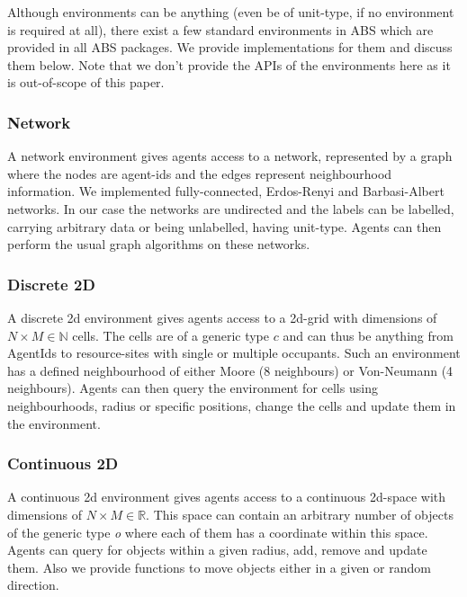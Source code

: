 Although environments can be anything (even be of unit-type, if no environment is required at all), there exist a few standard environments in ABS which are provided in all ABS packages. We provide implementations for them and discuss them below. Note that we don't provide the APIs of the environments here as it is out-of-scope of this paper.

\subsubsection{Network}
A network environment gives agents access to a network, represented by a graph where the nodes are agent-ids and the edges represent neighbourhood information. We implemented fully-connected, Erdos-Renyi and Barbasi-Albert networks. In our case the networks are undirected and the labels can be labelled, carrying arbitrary data or being unlabelled, having unit-type. Agents can then perform the usual graph algorithms on these networks. 

\subsubsection{Discrete 2D}
A discrete 2d environment gives agents access to a 2d-grid with dimensions of $N \times M \in \mathbb{N}$ cells. The cells are of a generic type $c$ and can thus be anything from AgentIds to resource-sites with single or multiple occupants. Such an environment has a defined neighbourhood of either Moore (8 neighbours) or Von-Neumann (4 neighbours). Agents can then query the environment for cells using neighbourhoods, radius or specific positions, change the cells and update them in the environment.

\subsubsection{Continuous 2D}
A continuous 2d environment gives agents access to a continuous 2d-space with dimensions of $N \times M \in \mathbb{R}$. This space can contain an arbitrary number of objects of the generic type \textit{o} where each of them has a coordinate within this space. Agents can query for objects within a given radius, add, remove and update them. Also we provide functions to move objects either in a given or random direction.

